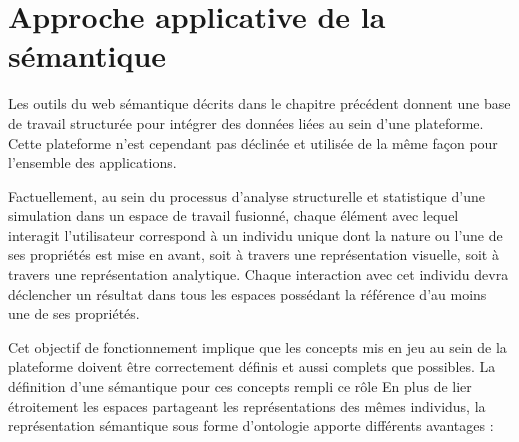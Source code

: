 \section{Approche applicative de la sémantique}




Les outils du web sémantique décrits dans le chapitre précédent donnent une base de travail structurée pour intégrer des données liées au sein d'une plateforme. Cette plateforme n'est cependant pas déclinée et utilisée de la même façon pour l'ensemble des applications.

Factuellement, au sein du processus d'analyse structurelle et statistique d'une simulation dans un espace de travail fusionné, chaque élément avec lequel interagit l'utilisateur correspond à un individu unique dont la nature ou l'une de ses propriétés est mise en avant, soit à travers une représentation visuelle, soit à travers une représentation analytique. Chaque interaction avec cet individu devra déclencher un résultat dans tous les espaces possédant la référence d'au moins une de ses propriétés.

Cet objectif de fonctionnement implique que les concepts mis en jeu au sein de la plateforme doivent être correctement définis et aussi complets que possibles. La définition d'une sémantique pour ces concepts rempli ce rôle
En plus de lier étroitement les espaces partageant les représentations des mêmes individus, la représentation sémantique sous forme d'ontologie apporte différents avantages :

